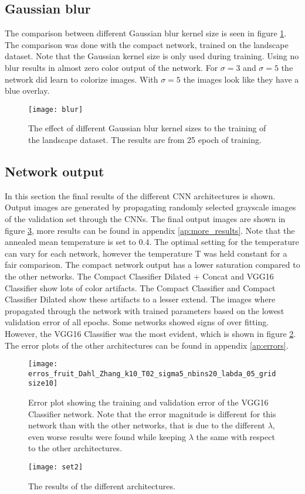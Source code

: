 \subsection{Gaussian blur}
The comparison between different Gaussian blur kernel size is seen in figure \ref{fig:blur}. The comparison was done with the compact network, trained on the landscape dataset. Note that the Gaussian kernel size is only used during training. Using no blur results in almost zero color output of the network. For $\sigma = 3$ and $\sigma = 5$ the network did learn to colorize images. With $\sigma = 5$ the images look like they have a blue overlay.

\begin{figure}[h]
	\centering
	\texttt{[image: blur]}
	\caption{The effect of different Gaussian blur kernel sizes to the training of the landscape dataset. The results are from 25 epoch of training.}
	\label{fig:blur}
\end{figure}

\subsection{Network output}
In this section the final results of the different CNN architectures is shown. Output images are generated by propagating randomly selected grayscale images of the validation set through the CNNs. The final output images are shown in figure \ref{fig:results}, more results can be found in appendix \ref{ap:more_results}. Note that the annealed mean temperature is set to $0.4$. The optimal setting for the temperature can vary for each network, however the temperature T was held constant for a fair comparison. The compact network output has a lower saturation compared to the other networks. The Compact Classifier Dilated + Concat and VGG16 Classifier show lots of color artifacts. The Compact Classifier and Compact Classifier Dilated show these artifacts to a lesser extend. The images where propagated through the network with trained parameters based on the lowest validation error of all epochs. Some networks showed signs of over fitting. However, the VGG16 Classifier was the most evident, which is shown in figure \ref{fig:overfit}. The error plots of the other architectures can be found in appendix \ref{ap:errors}.
\begin{figure}[h!]
	\centering
	\texttt{[image: erros\_fruit\_Dahl\_Zhang\_k10\_T02\_sigma5\_nbins20\_labda\_05\_gridsize10]}
	\caption{Error plot showing the training and validation error of the VGG16 Classifier network. Note that the error magnitude is different for this network than with the other networks, that is due to the different $\lambda$, even worse results were found while keeping $\lambda$ the same with respect to the other architectures.}
	\label{fig:overfit}
\end{figure}

\clearpage
\begin{figure}[h!]
	\centering
	\texttt{[image: set2]}
	\caption{The results of the different architectures.}
	\label{fig:results}
\end{figure}



